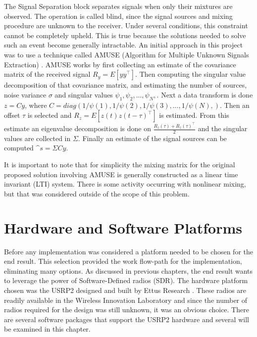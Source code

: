 The Signal Separation block separates signals when only their mixtures are observed.  The operation is called blind, since the signal sources and mixing procedure are unknown to the receiver.  Under several conditions, this constraint cannot be completely upheld.  This is true because the solutions needed to solve such an event become generally intractable.  An initial approach in this project was to use a technique called AMUSE (Algorithm for Multiple Unknown Signals Extraction) \cite{AMUSE}.  AMUSE works by first collecting an estimate of the covariance matrix of the received signal \(R_{y}=E[yy^\top]\). Then computing the singular value decomposition of that covariance matrix, and estimating the number of sources, noise variance \(\sigma\) and singular values \(\psi_{1},\psi_{2},...,\psi_{N},\).  Next a data transform is done \(z=Cy\), where \(C = diag(1/\psi(1),1/\psi(2),1/\psi(3),...,1/\psi(N),)\).  Then an offset \(\tau\) is selected and \(R_{z}=E[z(t)z(t-\tau)^\top]\) is estimated.  From this estimate an eigenvalue decomposition is done on \(\frac{R_{z}(\tau)+R_{z}(\tau)^\top}{2}\) and the singular values are collected in \(\Sigma\).  Finally an estimate of the signal sources can be computed \(\^s=\Sigma C y\).  

It is important to note that for simplicity the mixing matrix for the original proposed solution involving AMUSE is generally constructed as a linear time invariant (LTI) system.  There is some activity occurring with nonlinear mixing, but that was considered outside of the scope of this problem.\\

\section{Hardware and Software Platforms}

Before any implementation was considered a platform needed to be chosen for the end result.  This selection provided the work flow-path for the implementation, eliminating many options.  As discussed in previous chapters, the end result wants to leverage the power of Software-Defined radios (SDR).  The hardware platform chosen was the USRP2 designed and built by Ettus Research \cite{USRP2Stats}.  These radios are readily available in the Wireless Innovation Laboratory and since the number of radios required for the design was still unknown, it was an obvious choice.  There are several software packages that support the USRP2 hardware and several will be examined in this chapter.\\


